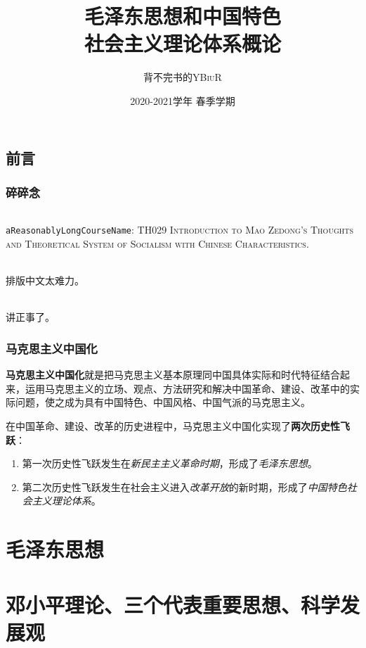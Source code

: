 \documentclass[oneside]{book}
\title{\Huge\textbf{毛泽东思想和中国特色\\社会主义理论体系概论}}
\author{背不完书的\textsc{YBiuR}}
\date{2020-2021学年{} 春季学期}
\begin{document}
\begin{spacing}{1.5}
\setlength{\parindent}{2em}

\frontmatter
\maketitle
\chapter*{前言}
\section*{碎碎念}
\paragraph{}\verb|aReasonablyLongCourseName|: \textsc{TH029 Introduction to Mao Zedong's Thoughts and Theoretical System of Socialism with Chinese Characteristics}.
\paragraph{}排版中文太难力。
\paragraph{}讲正事了。


\section*{马克思主义中国化}
    \textbf{马克思主义中国化}就是把马克思主义基本原理同中国具体实际和时代特征结合起来，运用马克思主义的立场、观点、方法研究和解决中国革命、建设、改革中的实际问题，使之成为具有中国特色、中国风格、中国气派的马克思主义。

    在中国革命、建设、改革的历史进程中，马克思主义中国化实现了\textbf{两次历史性飞跃}：
    \begin{enumerate}
        \item 第一次历史性飞跃发生在\emph{新民主主义革命时期}，形成了\emph{毛泽东思想}。
        \item 第二次历史性飞跃发生在社会主义进入\emph{改革开放}的新时期，形成了\emph{中国特色社会主义理论体系}。
    \end{enumerate}


\tableofcontents

\mainmatter
\part{毛泽东思想}





\part{邓小平理论、三个代表重要思想、科学发展观}




\end{spacing}
\end{document}
